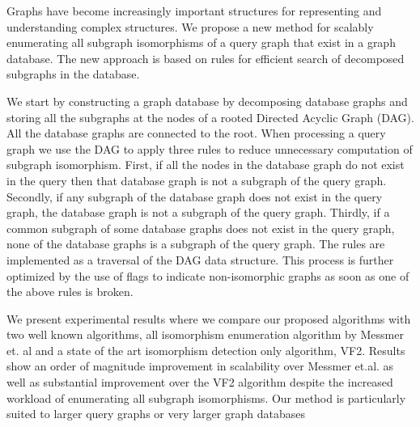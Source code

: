 
Graphs have become increasingly important structures for representing and understanding complex structures.
We propose a new method for scalably enumerating all subgraph isomorphisms of a query graph that exist in a graph database. The new approach is based on rules for efficient search of decomposed subgraphs in the database.

We start by constructing a graph database by decomposing database graphs and storing all the subgraphs at the nodes of a rooted Directed Acyclic Graph (DAG). All the database graphs are connected to the root. When processing a query graph we use the DAG to apply three rules to reduce unnecessary computation of subgraph isomorphism. First, if all the nodes in the database graph do not exist in the query then that database graph is not a subgraph of the query graph. Secondly, if any subgraph of the database graph does not exist in the query graph, the database graph is not a subgraph of the query graph. Thirdly, if a common subgraph of some database graphs does not exist in the query graph, none of the database graphs is a subgraph of the query graph. The rules are implemented as a traversal of the DAG data structure. This process is further optimized by the use of flags to indicate non-isomorphic graphs as soon as one of the above rules is broken. 

We present experimental results where we compare our proposed algorithms with two well known algorithms, all isomorphism enumeration algorithm by Messmer et. al and a state of the art isomorphism detection only algorithm, VF2. Results show an order of magnitude improvement in scalability over Messmer et.al. as well as substantial improvement over the VF2 algorithm despite the increased workload of enumerating all subgraph isomorphisms. Our method is particularly suited to larger query graphs or very larger graph databases


